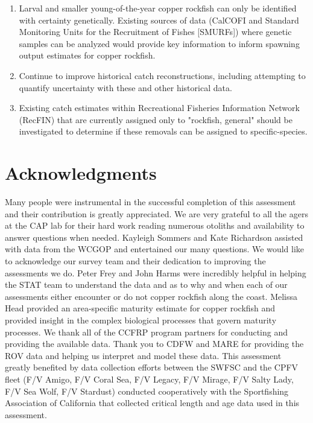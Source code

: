 \documentclass[11pt,
  english,
  letterpaper,
]{article}
\begin{document}
\begin{enumerate}
 \item Larval and smaller young-of-the-year copper rockfish can only be identified with certainty genetically. Existing sources of data (CalCOFI and Standard Monitoring Units for the Recruitment of Fishes [SMURFs]) where genetic samples can be analyzed would provide key information to inform spawning output estimates for copper rockfish.
 
  \item Continue to improve historical catch reconstructions, including attempting to quantify uncertainty with these and other historical data.
  
  \item Existing catch estimates within Recreational Fisheries Information Network (RecFIN) that are currently assigned only to "rockfish, general" should be investigated to determine if these removals can be assigned to specific-species.



\end{enumerate}

\hypertarget{acknowledgments}{%
\section{Acknowledgments}\label{acknowledgments}}

Many people were instrumental in the successful completion of this assessment and their contribution is greatly appreciated. We are very grateful to all the agers at the CAP lab for their hard work reading numerous otoliths and availability to answer questions when needed. Kayleigh Sommers and Kate Richardson assisted with data from the WCGOP and entertained our many questions. We would like to acknowledge our survey team and their dedication to improving the assessments we do. Peter Frey and John Harms were incredibly helpful in helping the STAT team to understand the data and as to why and when each of our assessments either encounter or do not copper rockfish along the coast. Melissa Head provided an area-specific maturity estimate for copper rockfish and provided insight in the complex biological processes that govern maturity processes. We thank all of the CCFRP program partners for conducting and providing the available data. Thank you to CDFW and MARE for providing the ROV data and helping us interpret and model these data. This assessment greatly benefited by data collection efforts between the SWFSC and the CPFV fleet (F/V Amigo, F/V Coral Sea, F/V Legacy, F/V Mirage, F/V Salty Lady, F/V Sea Wolf, F/V Stardust) conducted cooperatively with the Sportfishing Association of California that collected critical length and age data used in this assessment.
\end{document}

